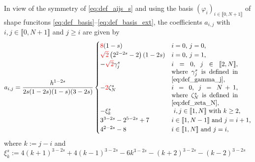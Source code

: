 \documentclass[11 pt]{article}
\newcommand\inter[1]{\llbracket #1\rrbracket}
\numberwithin{equation}{section}
\newcommand{\B}[1]{{\color{red} #1}}  %
\begin{document}
%
In view of the symmetry of \eqref{eq:def_aijs_s} and using the basis $(\varphi_i)_{i\in\inter{0,N+1}}$ of shape funcitons \eqref{eq:def_basis}--\eqref{eq:def_basis_ext}, the coefficients $a_{i,j}$ with $i,j\in\inter{0,N+1}$ and $j\geq i$ are given by
%
%
\begin{equation}\label{stiff:frac}
a_{i,j}= \frac{h^{1 - 2 s}}{2s(1-2s)(1-s)(3-2s)}
\begin{cases}
\B{8}(1-s) & \textnormal{$i=0$, $j=0$,} \\
\B{\sqrt{2}}\left(2^{2-2 s}-2\right)(1-2s) & \textnormal{$i=0$, $j=1$,} \\
-\B{\sqrt{2}}\gamma_j^s  & \parbox[t]{.3\columnwidth}{$i=0$, $j\in\inter{2,N}$, where $\gamma_j^s$ is defined in \eqref{eq:def_gamma_j},}\\
-\B{2}\zeta^s_{N}  & \parbox[t]{.3\columnwidth}{$i=0$, $j=N+1$, where $\zeta_N^s$ is defined in \eqref{eq:def_zeta_N},}\\
-\xi_k^s & \textnormal{ $i,j\in\inter{1,N}$ with $k\geq 2$,} \\
3^{3-2s}-2^{5-2s}+7 & \textnormal{$i\in\inter{1,N-1}$ and $j=i+1$,} \\
4^{2-2s}-8 & \textnormal{$i\in\inter{1,N}$ and $j=i$,}
\end{cases}
\end{equation}
where $k:=j-i$ and $\xi^s_k:=4(k+1)^{3-2s} + 4(k-1)^{3-2s}-6k^{3-2s}-(k+2)^{3-2s}-(k-2)^{3-2s}$
\end{document}
